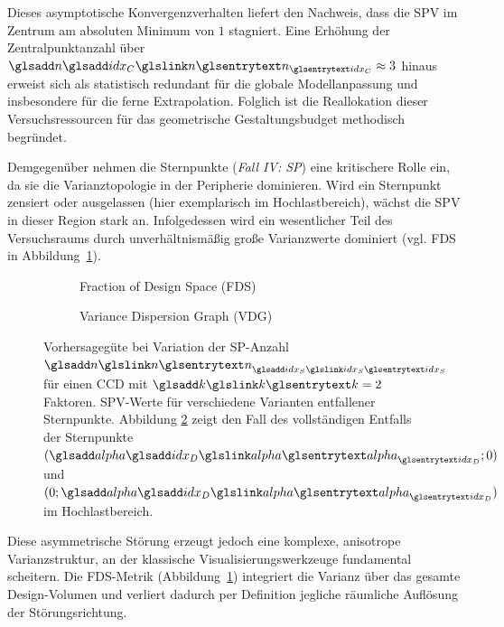 Dieses asymptotische Konvergenzverhalten liefert den Nachweis, dass die \ac{SPV} im Zentrum am absoluten Minimum von $1$ stagniert.
Eine Erhöhung der Zentralpunktanzahl über $\symsub{n}{idx_C} \approx 3$ hinaus erweist sich als statistisch redundant für die globale Modellanpassung und insbesondere für die ferne Extrapolation.
Folglich ist die Reallokation dieser Versuchsressourcen für das geometrische Gestaltungsbudget methodisch begründet.


Demgegenüber nehmen die Sternpunkte (\textit{Fall IV: \ac{SP}}) eine kritischere Rolle ein, da sie die Varianztopologie in der Peripherie dominieren.
Wird ein Sternpunkt zensiert oder ausgelassen (hier exemplarisch im Hochlastbereich), wächst die \ac{SPV} in dieser Region stark an.
Infolgedessen wird ein wesentlicher Teil des Versuchsraums durch unverhältnismäßig große Varianzwerte dominiert (vgl. \ac{FDS} in Abbildung~\ref{fig:ma_abb5.2.1_fds_omitted}).
\begin{figure}[htbp]
    \centering
    \setlength\figureheight{5cm}
    \begin{subfigure}[b]{0.48\textwidth}
        \centering
        \setlength{}
        
        \caption{Fraction of Design Space (\ac{FDS})}
        \label{fig:ma_abb5.2.1_fds_omitted}
    \end{subfigure}
    \hfill
    \begin{subfigure}[b]{0.48\textwidth}
        \centering
        \setlength{}
        
        \caption{Variance Dispersion Graph (\ac{VDG})}
        \label{fig:ma_abb5.2.1_vdg_omitted}
    \end{subfigure}
    \caption{Vorhersagegüte bei Variation der \ac{SP}-Anzahl $\sym{n}_{\sym{idx_S}}$ für einen \ac{CCD} mit $\sym{k}=2$ Faktoren. \ac{SPV}-Werte für verschiedene Varianten entfallener Sternpunkte. Abbildung \ref{fig:ma_abb5.2.1_vdg_omitted} zeigt den Fall des vollständigen Entfalls der Sternpunkte $(\symsub{alpha}{idx_D};0)$ und $(0;\symsub{alpha}{idx_D})$ im Hochlastbereich.}
    \label{fig:ma_abb5.2.1_fdsvdg_omitted}
\end{figure}
Diese asymmetrische Störung erzeugt jedoch eine komplexe, anisotrope Varianzstruktur, an der klassische Visualisierungswerkzeuge fundamental scheitern.
Die \ac{FDS}-Metrik (Abbildung~\ref{fig:ma_abb5.2.1_fds_omitted}) integriert die Varianz über das gesamte Design-Volumen und verliert dadurch per Definition jegliche räumliche Auflösung der Störungsrichtung.

